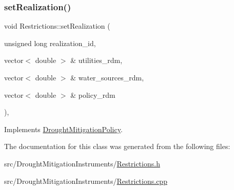 \mbox{\label{classRestrictions_abc17a8a403311933a3bb58fbecd5f5fd}} 
\subsubsection{\texorpdfstring{set\+Realization()}{setRealization()}}
{\footnotesize\ttfamily void Restrictions\+::set\+Realization (\begin{DoxyParamCaption}\item[{unsigned long}]{realization\+\_\+id,  }\item[{vector$<$ double $>$ \&}]{utilities\+\_\+rdm,  }\item[{vector$<$ double $>$ \&}]{water\+\_\+sources\+\_\+rdm,  }\item[{vector$<$ double $>$ \&}]{policy\+\_\+rdm }\end{DoxyParamCaption})\hspace{0.3cm}{\ttfamily [override]}, {\ttfamily [virtual]}}



Implements \mbox{\hyperlink{classDroughtMitigationPolicy_a5d2033543cacca1e412eebef5106eab4}{Drought\+Mitigation\+Policy}}.



The documentation for this class was generated from the following files\+:\begin{DoxyCompactItemize}
\item 
src/\+Drought\+Mitigation\+Instruments/\mbox{\hyperlink{Restrictions_8h}{Restrictions.\+h}}\item 
src/\+Drought\+Mitigation\+Instruments/\mbox{\hyperlink{Restrictions_8cpp}{Restrictions.\+cpp}}\end{DoxyCompactItemize}
